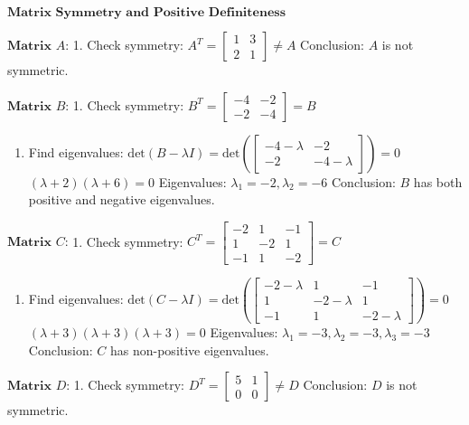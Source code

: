 \documentclass[11pt]{article}
\providecommand{\tightlist}{%
      \setlength{\itemsep}{0pt}\setlength{\parskip}{0pt}}
\begin{document}
    $\textbf{Matrix Symmetry and Positive Definiteness}$

$\textbf{Matrix $A$:}$ 1. Check symmetry:
$A^T = \begin{bmatrix} 1 & 3 \\ 2 & 1 \end{bmatrix} \neq A$
Conclusion: $A$ is not symmetric.

$\textbf{Matrix $B$:}$ 1. Check symmetry:
$B^T = \begin{bmatrix} -4 & -2 \\ -2 & -4 \end{bmatrix} = B$

\begin{enumerate}
\def\labelenumi{\arabic{enumi}.}
\setcounter{enumi}{1}
\tightlist
\item
  Find eigenvalues:
  $\text{det}(B - \lambda I) = \text{det}\left(\begin{bmatrix} -4-\lambda & -2 \\ -2 & -4-\lambda \end{bmatrix}\right) = 0$
  $(\lambda + 2)(\lambda + 6) = 0$ Eigenvalues:
  $\lambda_1 = -2, \lambda_2 = -6$ Conclusion: $B$ has both positive
  and negative eigenvalues.
\end{enumerate}

$\textbf{Matrix $C$:}$ 1. Check symmetry:
$C^T = \begin{bmatrix} -2 & 1 & -1 \\ 1 & -2 & 1 \\ -1 & 1 & -2 \end{bmatrix} = C$

\begin{enumerate}
\def\labelenumi{\arabic{enumi}.}
\setcounter{enumi}{1}
\tightlist
\item
  Find eigenvalues:
  $\text{det}(C - \lambda I) = \text{det}\left(\begin{bmatrix} -2-\lambda & 1 & -1 \\ 1 & -2-\lambda & 1 \\ -1 & 1 & -2-\lambda \end{bmatrix}\right) = 0$
  $(\lambda + 3)(\lambda + 3)(\lambda + 3) = 0$ Eigenvalues:
  $\lambda_1 = -3, \lambda_2 = -3, \lambda_3 = -3$ Conclusion: $C$
  has non-positive eigenvalues.
\end{enumerate}

$\textbf{Matrix $D$:}$ 1. Check symmetry:
$D^T = \begin{bmatrix} 5 & 1 \\ 0 & 0 \end{bmatrix} \neq D$
Conclusion: $D$ is not symmetric.
\end{document}
